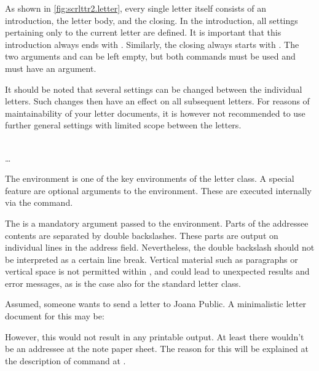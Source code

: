 As shown in \autoref{fig:scrlttr2.letter}, every single letter itself consists
of an introduction, the letter body, and the closing. In the introduction, all
settings pertaining only to the current letter are defined. It is important
that this introduction always ends with
. Similarly, the closing always starts with
. The two arguments  and
 can be left empty, but both commands must be used and must
have an argument.

It should be noted that several settings can be changed between the individual
letters. Such changes then have an effect on all subsequent letters. For
reasons of maintainability of your letter documents, it is however not
recommended to use further general settings with limited scope between the
letters.

\begin{Declaration}
  \\
  \quad\dots\\
\end{Declaration}
%
%
The  environment is one of the key environments of the
letter class. A special
 feature are optional arguments to the 
environment. These  are executed internally via the
 command.

The  is a mandatory argument passed to the
 environment. Parts of the addressee
contents are separated by double backslashes. These parts are output on
individual lines in the address field. Nevertheless, the double backslash
should not be interpreted as a certain line break. Vertical material such as
paragraphs or vertical space is not permitted within , and
could lead to unexpected results and error messages, as is the case also for
the standard letter class.

\begin{Example}
  \label{desc:scrlttr2.env.letter.example}%
  Assumed, someone wants to send a letter to Joana Public. A minimalistic
  letter document for this may be:
  However, this would not result in any printable output. At least there
  wouldn't be an addressee at the note paper sheet. The reason for this will
  be explained at the description of command  at
  .
\end{Example}
%
%
%

